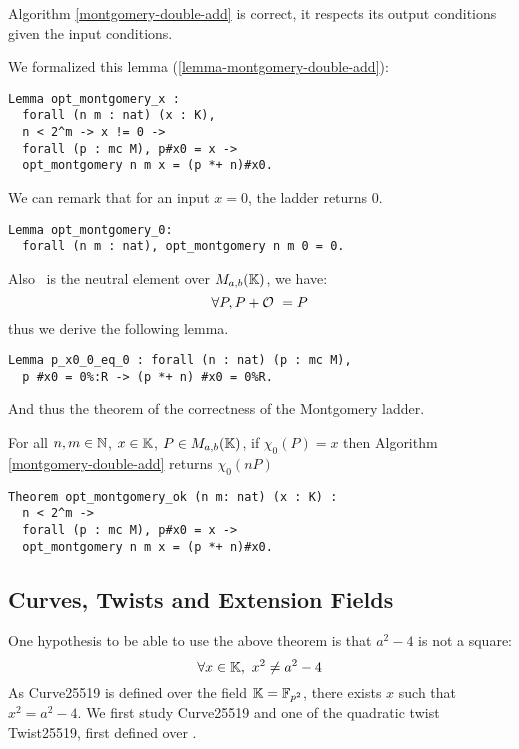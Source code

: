 \begin{lemma}
\label{lemma-montgomery-double-add}
Algorithm \ref{montgomery-double-add} is correct, \ie it respects its output conditions given the input conditions.
\end{lemma}


We formalized this lemma (\ref{lemma-montgomery-double-add}):
\begin{lstlisting}[language=Coq]
Lemma opt_montgomery_x :
  forall (n m : nat) (x : K),
  n < 2^m -> x != 0 ->
  forall (p : mc M), p#x0 = x ->
  opt_montgomery n m x = (p *+ n)#x0.
\end{lstlisting}

We can remark that for an input $x = 0$, the ladder returns $0$.
\begin{lstlisting}[language=Coq]
Lemma opt_montgomery_0:
  forall (n m : nat), opt_montgomery n m 0 = 0.
\end{lstlisting}
Also \Oinf\ is the neutral element over $M_{a,b}(\mathbb{K})$, we have:
$$\forall P, P + \mathcal{O}\ = P$$
thus we derive the following lemma.
\begin{lstlisting}[language=Coq]
Lemma p_x0_0_eq_0 : forall (n : nat) (p : mc M),
  p #x0 = 0%:R -> (p *+ n) #x0 = 0%R.
\end{lstlisting}
And thus the theorem of the correctness of the Montgomery ladder.
\begin{theorem}
\label{montgomery-ladder-correct}
For all $n, m \in \mathbb{N}$, $x \in \mathbb{K}$, $P \in M_{a,b}(\mathbb{K})$,
if $\chi_0(P) = x$ then Algorithm \ref{montgomery-double-add} returns $\chi_0(nP)$
\end{theorem}
\begin{lstlisting}[language=Coq]
Theorem opt_montgomery_ok (n m: nat) (x : K) :
  n < 2^m ->
  forall (p : mc M), p#x0 = x ->
  opt_montgomery n m x = (p *+ n)#x0.
\end{lstlisting}

\subsection{Curves, Twists and Extension Fields}

One hypothesis to be able to use the above theorem is that $a^2-4$ is not a square:
$$\forall x \in \mathbb{K},\ x^2 \neq a^2-4$$
As Curve25519 is defined over the field $\mathbb{K} = \mathbb{F}_{p^2}$, there exists $x$ such that $x^2 = a^2-4$.
We first study Curve25519 and one of the quadratic twist Twist25519, first defined over .


